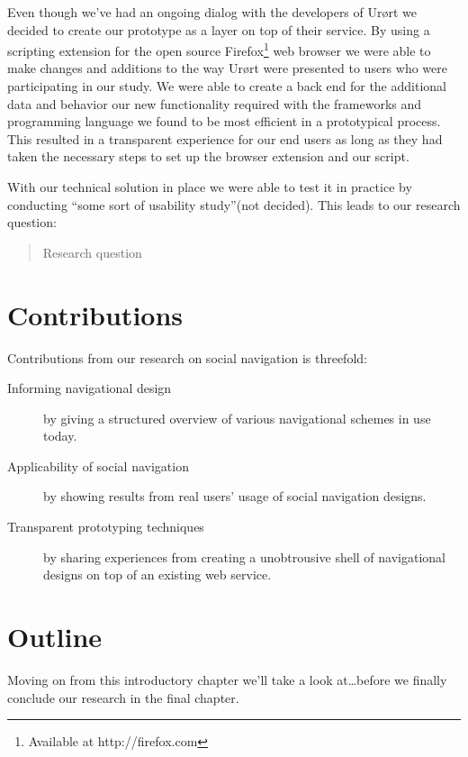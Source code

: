 Even though we've had an ongoing dialog with the developers of Ur\o{}rt we
decided to create our prototype as a layer on top of their service. By using a
scripting extension for the open source
Firefox\footnote{Available at http://firefox.com}
web browser we were able to make changes and additions to the way Ur\o{}rt were
presented to users who were participating in our study. We were able to create
a back end for the additional data and behavior our new functionality required
with the frameworks and programming language we found to be most efficient in
a prototypical process. This resulted in a transparent experience for our end
users as long as they had taken the necessary steps to set up the browser
extension and our script.

With our technical solution in place we were able to test it in practice by
conducting ``some sort of usability study''(not decided). This leads to our
research question:


\begin{quote}
  Research question
\end{quote}

\section{Contributions}

Contributions from our research on social navigation is threefold:

\begin{description}
  \item[Informing navigational design] by giving a structured overview of
    various navigational schemes in use today.
  \item[Applicability of social navigation] by showing results from real
    users' usage of social navigation designs.
  \item[Transparent prototyping techniques] by sharing experiences from
    creating a unobtrousive shell of navigational designs on top of an
    existing web service.
\end{description}

\section{Outline}

Moving on from this introductory chapter we'll take a look at\ldots before we
finally conclude our research in the final chapter.

